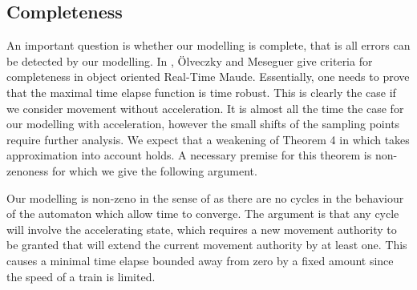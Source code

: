 \subsection{Completeness}
An important question is whether our modelling is complete, that is
all errors can be detected by our
modelling. In \cite{PO06}, \"Olveczky and Meseguer give criteria for
completeness in object oriented Real-Time Maude. Essentially, one
needs to prove that the maximal time elapse function is time
robust. This is clearly the case if we consider movement without
acceleration. It is almost all the time the case for our modelling
with acceleration, however the small shifts of the sampling points
require further analysis. We expect that a weakening of Theorem 4
in \cite{PO06} which takes approximation into account holds.  A
necessary premise for this theorem is non-zenoness for which we give
the following argument.

Our modelling is non-zeno in the sense of \cite{Henzinger2000} as
there are no cycles in the behaviour of the automaton which allow time
to converge.  The argument is that any cycle will involve the
accelerating state, which requires a new movement authority to be
granted that will extend the current movement authority by at least
one. This causes a minimal time elapse bounded away from zero by a
fixed amount since the speed of a train is limited.


